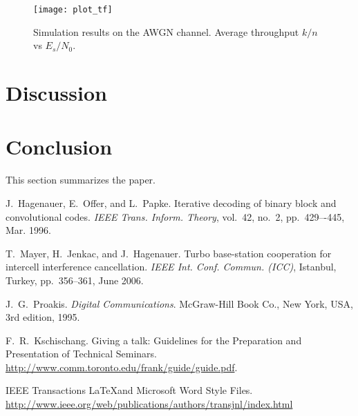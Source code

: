 \documentclass[journal, a4paper]{IEEEtran}
\begin{document}

    \begin{figure}[!hbt]
        \begin{center}
        \texttt{[image: plot\_tf]}
        \caption{Simulation results on the AWGN channel. Average throughput $k/n$ vs $E_s/N_0$.}
        \label{fig:tf_plot}
        \end{center}
    \end{figure}

\section{Discussion}



\section{Conclusion}
    This section summarizes the paper.

\begin{thebibliography}{5}

    J.~Hagenauer, E.~Offer, and L.~Papke. Iterative decoding of binary block
    and convolutional codes. {\em IEEE Trans. Inform. Theory},
    vol.~42, no.~2, pp.~429–-445, Mar. 1996.

    T.~Mayer, H.~Jenkac, and J.~Hagenauer. Turbo base-station cooperation for intercell interference cancellation. {\em IEEE Int. Conf. Commun. (ICC)}, Istanbul, Turkey, pp.~356--361, June 2006.

    J.~G.~Proakis. {\em Digital Communications}. McGraw-Hill Book Co.,
    New York, USA, 3rd edition, 1995.

    F.~R.~Kschischang. Giving a talk: Guidelines for the Preparation and Presentation of Technical Seminars.
    \url{http://www.comm.toronto.edu/frank/guide/guide.pdf}.

    IEEE Transactions \LaTeX and Microsoft Word Style Files.
    \url{http://www.ieee.org/web/publications/authors/transjnl/index.html}

\end{thebibliography}

\end{document}
